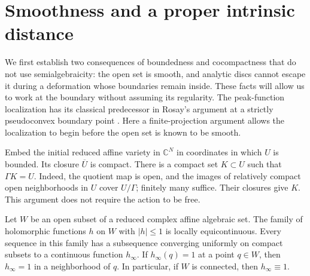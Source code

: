 \section{Smoothness and a proper intrinsic distance}\label{sec:geometry}

We first establish two consequences of boundedness and cocompactness that do not use semialgebraicity: the open set is smooth, and analytic discs cannot escape it during a deformation whose boundaries remain inside.  These facts will allow us to work at the boundary without assuming its regularity. The peak-function localization has its classical predecessor in Rosay's argument at a strictly pseudoconvex boundary point \cite[Section~3, Lemma~2]{Rosay1979}. Here a finite-projection argument allows the localization to begin before the open set is known to be smooth.

Embed the initial reduced affine variety in $\mathbb{C}^N$ in coordinates in which $U$ is bounded.  Its closure $\overline U$ is compact.  There is a compact set $K\subset U$ such that $\Gamma K=U$.  Indeed, the quotient map is open, and the images of relatively compact open neighborhoods in $U$ cover $U/\Gamma$; finitely many suffice.  Their closures give $K$.  This argument does not require the action to be free.

\begin{lemma}\label{lem:singular-montel}
Let $W$ be an open subset of a reduced complex affine algebraic set.  The family of holomorphic functions $h$ on $W$ with $|h|\leq 1$ is locally equicontinuous.  Every sequence in this family has a subsequence converging uniformly on compact subsets to a continuous function $h_\infty$. If $h_\infty(q)=1$ at a point $q\in W$, then $h_\infty=1$ in a neighborhood of $q$.  In particular, if $W$ is connected, then $h_\infty\equiv 1$.
\end{lemma}


